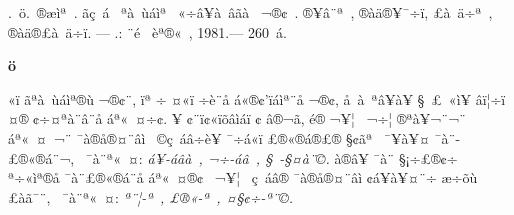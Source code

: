 \documentclass[12pt,twoside,a4paper]{article}
\begin{document}
\noindent
^^8d.~^^f6.~^^92^^ae^^e6^^ec^^aa^^a0.
^^91^^e3^^e7^^a0^^e1^^ad^^a0 ^^93^^aa^^e0^^a0^^f9^^ad^^e1^^ec^^aa^^a0 ^^ab^^f7^^e2^^a5^^e0^^a0^^e2^^e3^^e0^^ad^^a0 ^^ac^^ae^^a2^^a0. 
^^94^^ae^^ad^^a5^^e2^^a8^^aa^^a0, ^^ae^^e0^^e4^^ae^^a5^^af^^f7^^ef, ^^a3^^e0^^a0^^e4^^f7^^aa^^a0, ^^ae^^e0^^e4^^ae^^a3^^e0^^a0^^e4^^f7^^ef. ---
^^8a.: ^^82^^a8^^e9^^a0 ^^e8^^aa^^ae^^ab^^a0, 1981.--- 260~^^e1.\\
\null\noindent\hrulefill

\vfill

\begin{center}
\textbf{^^91^^8a^^8b^^80^^84^^8e^^8f^^8e^^84^^f6^^8b}
\end{center}

\indent
^^84^^ab^^ef ^^e3^^aa^^e0^^a0^^f9^^ad^^e1^^ec^^aa^^ae^^f9 ^^ac^^ae^^a2^^a8, ^^ef^^aa ^^f7 ^^a4^^ab^^ef ^^f7^^ad^^e8^^a8^^e5 ^^e1^^ab^^ae^^a2'^^ef^^ad^^e1^^ec^^aa^^a8^^e5\linebreak 
^^ac^^ae^^a2, ^^e5^^a0^^e0^^a0^^aa^^e2^^a5^^e0^^ad^^a5 ^^a7^^a0^^a3^^a0^^ab^^ec^^ad^^a5 ^^e2^^ef^^a6^^f7^^ad^^ad^^ef ^^a4^^ae ^^a2^^f7^^a4^^aa^^e0^^a8^^e2^^a8^^e5 ^^e1^^aa^^ab^^a0^^a4^^f7^^a2.\linebreak
^^96^^a5 ^^a2^^a8^^ef^^a2^^ab^^ef^^f5^^e2^^ec^^e1^^ef ^^a2 ^^e2^^ae^^ac^^e3, ^^e9^^ae ^^ac^^a5^^a6^^a0 ^^ac^^f7^^a6 ^^ae^^aa^^e0^^a5^^ac^^a8^^ac^^a8 ^^e1^^aa^^ab^^a0^^a4^^a0^^ac^^a8\linebreak
^^af^^e0^^ae^^e5^^ae^^a4^^a8^^e2^^ec ^^ad^^a0^^a9^^e7^^a0^^e1^^e2^^f7^^e8^^a5 ^^af^^f7^^e1^^ab^^ef ^^a3^^ae^^ab^^ae^^e1^^ad^^ae^^a3^^ae ^^a7^^a2^^e3^^aa^^a0 ^^af^^a5^^e0^^a5^^a4 ^^af^^e0^^a8-\linebreak
^^a3^^ae^^ab^^ae^^e1^^ad^^a8^^ac, ^^ad^^a0^^af^^e0^^a8^^aa^^ab^^a0^^a4: \emph{^^e1^^a5-^^e1^^e2^^e0^^a0, ^^ac^^f7-^^e1^^e2^^a0, ^^a7^^a0-^^a7^^a4^^e0^^a8^^a9.} ^^8f^^e0^^ae^^e2^^a5\linebreak
^^af^^e0^^a8 ^^a7^^a1^^f7^^a3^^ae^^a2^^f7 ^^aa^^f7^^ab^^ec^^aa^^ae^^e5 ^^af^^e0^^a8^^a3^^ae^^ab^^ae^^e1^^ad^^a8^^e5 ^^e1^^aa^^ab^^a0^^a4^^ae^^a2^^a0 ^^ac^^a5^^a6^^a0 ^^e7^^a0^^e1^^e2^^ae\linebreak
^^af^^e0^^ae^^e5^^ae^^a4^^a8^^e2^^ec ^^a2^^e1^^a5^^e0^^a5^^a4^^a8^^ad^^f7 ^^e6^^f7^^f5^^f9 ^^a3^^e0^^e3^^af^^a8, ^^ad^^a0^^af^^e0^^a8^^aa^^ab^^a0^^a4: \emph{^^aa^^ad^^a8^^a6-^^aa^^a0,\linebreak 
^^a3^^ae^^ab-^^aa^^a0, ^^a4^^a7^^a2^^f7^^ad-^^aa^^a8^^a9.}
\end{document}
